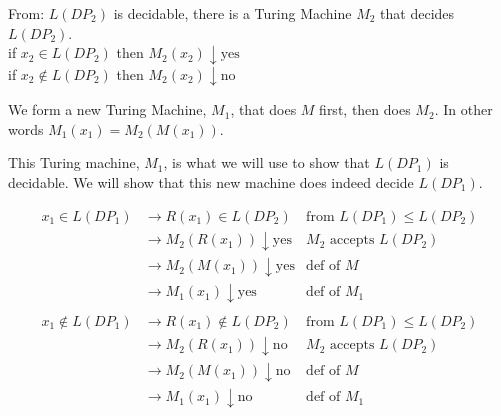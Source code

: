 From: $L(DP_2)$ is decidable, there is a Turing Machine $M_2$ that 
decides $L(DP_2)$. \\
if $x_2 \in L(DP_2)$ then $M_2(x_2) \downarrow \text{yes}$\\
if $x_2 \notin L(DP_2)$ then $M_2(x_2) \downarrow \text{no}$

We form a new Turing Machine, $M_1$, that does $M$ first, 
then does $M_2$. In other words $M_1(x_1) = M_2(M(x_1))$.



This Turing machine, $M_1$, is what we will use to show that $L(DP_1)$ is decidable.
We will show that this new machine does indeed decide $L(DP_1)$.

\[ 
\begin{array}{rll}
x_1 \in L(DP_1) &\rightarrow  R(x_1) \in L(DP_2) & \text{from } L(DP_1) \leqslant L(DP_2) \\
               &\rightarrow  M_2(R(x_1)) \downarrow \text{yes} & M_2 \text{ accepts } L(DP_2)  \\
               &\rightarrow  M_2(M(x_1)) \downarrow \text{yes} & \text{def of } M \\
               &\rightarrow  M_1(x_1) \downarrow \text{yes} & \text{def of } M_1  \\
               & & \\
x_1 \notin L(DP_1) &\rightarrow  R(x_1) \notin L(DP_2) & \text{from } L(DP_1) \leqslant L(DP_2) \\
               &\rightarrow  M_2(R(x_1)) \downarrow \text{no} & M_2 \text{ accepts } L(DP_2)  \\
               &\rightarrow  M_2(M(x_1)) \downarrow \text{no} & \text{def of } M \\
               &\rightarrow  M_1(x_1) \downarrow \text{no} & \text{def of } M_1  \\
\end{array}
\]

